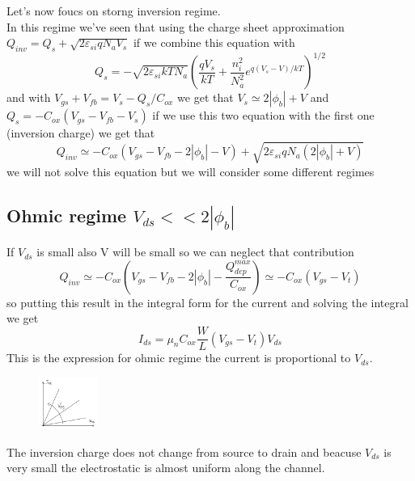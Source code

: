 Let's now foucs on storng inversion regime.\\
In this regime we've seen that using the charge sheet approximation $Q_{inv}=Q_s+\sqrt{2\varepsilon_{si}qN_aV_s}$ if we combine this equation with 
\begin{equation}
Q_s=-\sqrt{2\varepsilon_{si}kTN_a}\left(\frac{qV_s}{kT}+\frac{n_i^2}{N_a^2}e^{q(V_s-V)/kT}\right)^{1/2}
\end{equation}
 and with $V_{gs}+V_{fb}=V_{s}-Q_s/C_{ox}$ we get that $V_s\simeq2|\phi_b|+V$ and $Q_s=-C_{ox}(V_{gs}-V_{fb}-V_{s})$ if we use this two equation with the first one (inversion charge) we get that
\begin{equation}
Q_{inv}\simeq -C_{ox}(V_{gs}-V_{fb}-2|\phi_b|-V)+\sqrt{2\varepsilon_{si}qN_a(2|\phi_b|+V)}
\end{equation}
we will not solve this equation but we will consider some different regimes


\subsection{Ohmic regime $V_{ds}<<2|\phi_b|$}

If $V_{ds}$ is small also V will be small so we can neglect that contribution 
\begin{equation}
Q_{inv}\simeq -C_{ox}(V_{gs}-V_{fb}-2|\phi_b|-\frac{Q_{dep}^{max}}{C_{ox}})\simeq -C_{ox}(V_{gs}-V_t)
\end{equation}
so putting this result in the integral form for the current and solving the integral we get
\begin{equation}
I_{ds}=\mu_nC_{ox}\frac{W}{L}(V_{gs}-V_t)V_{ds}
\end{equation}
This is the expression for ohmic regime the current is proportional to $V_{ds}$.\\
\begin{figure}
\includegraphics[width=0.17\textwidth]{ohmreg.png}
\end{figure}

The inversion charge does not change from source to drain and beacuse $V_{ds}$ is very small the electrostatic is almost uniform along the channel.\\


